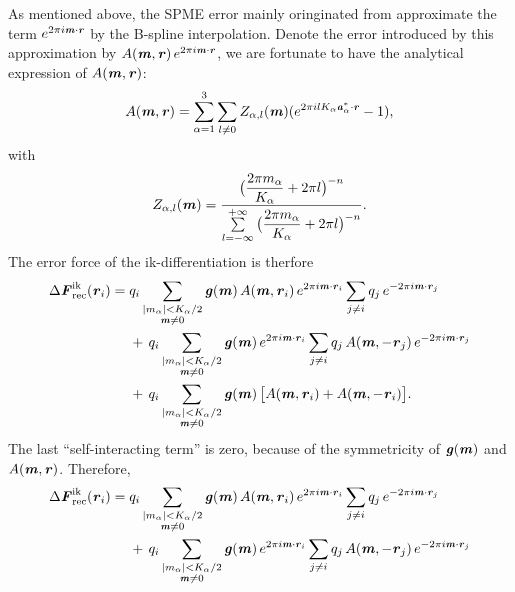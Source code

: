 \documentclass[aps,pre,preprint]{revtex4}
\renewcommand{\v}[1]{\textbf{\textit{#1}}}
\begin{document}
As mentioned above, the SPME error mainly oringinated from approximate
the term $e^{2\pi i\v m\cdot\v r}$ by the B-spline
interpolation. Denote the error introduced by this approximation by
$A(\v m, \v r)\,e^{2\pi i\v m\cdot \v r}$, we are fortunate to have
the analytical expression of $A(\v m, \v r)$:
\begin{align}\label{eqn:error-A}
  A(\v m, \v r)
  =
  \sum_{\alpha=1}^3\sum_{l\neq 0}
  Z_{\alpha,l}(\v m)
  (
  e^{2\pi i l K_\alpha\v a^\ast_\alpha\cdot \v r} - 1
  ),
\end{align}
with
\begin{align}
  Z_{\alpha,l}(\v m) = \frac
  {\big(\dfrac{2\pi m_\alpha}{K_\alpha} + 2\pi l\big)^{-n}}
  {\sum\limits_{l=-\infty}^{+\infty}
    \big(\dfrac{2\pi m_\alpha}{K_\alpha} + 2\pi l\big)^{-n}}.
\end{align}
The error force of the ik-differentiation is therfore
\begin{align}\nonumber
  \Delta\v F_{\textrm{rec}}^{\textrm{ik}}(\v r_i)
  =\;&
  q_i
  \sum_{
    \begin{subarray}{c}
      \vert m_{\alpha}\vert < K_\alpha/2\\
      \v m\neq 0
    \end{subarray}}
  \v g(\v m)\,
  A(\v m, \v r_i)\,
  e^{2\pi i\v m\cdot \v r_i}
  \sum_{j\neq i}q_j\,e^{-2\pi i\v m\cdot\v r_j} \\\nonumber
  & +\,
  q_i
  \sum_{
    \begin{subarray}{c}
      \vert m_{\alpha}\vert < K_\alpha/2\\
      \v m\neq 0
    \end{subarray}}
  \v g(\v m)\,
  e^{2\pi i\v m\cdot \v r_i}
  \sum_{j\neq i}q_j\,A(\v m, -\v r_j)\,e^{-2\pi i\v m\cdot\v r_j}\\\label{eqn:tmp19}
  & +\,
  q_i
  \sum_{
    \begin{subarray}{c}
      \vert m_{\alpha}\vert < K_\alpha/2\\
      \v m\neq 0
    \end{subarray}}
  \v g(\v m)\,
  \big[
  A(\v m, \v r_i) +
  A(\v m, -\v r_i)
  \big].
\end{align}
The last ``self-interacting term'' is zero, because of the
symmetricity of $\v g(\v m)$ and $A(\v m, \v r)$.
Therefore,
\begin{align}\nonumber
  \Delta\v F_{\textrm{rec}}^{\textrm{ik}}(\v r_i)
  =\;&
  q_i
  \sum_{
    \begin{subarray}{c}
      \vert m_{\alpha}\vert < K_\alpha/2\\
      \v m\neq 0
    \end{subarray}}
  \v g(\v m)\,
  A(\v m, \v r_i)\,
  e^{2\pi i\v m\cdot \v r_i}
  \sum_{j\neq i}q_j\,e^{-2\pi i\v m\cdot\v r_j} \\\label{eqn:ik.error.force}
  & +\,
  q_i
  \sum_{
    \begin{subarray}{c}
      \vert m_{\alpha}\vert < K_\alpha/2\\
      \v m\neq 0
    \end{subarray}}
  \v g(\v m)\,
  e^{2\pi i\v m\cdot \v r_i}
  \sum_{j\neq i}q_j\,A(\v m, -\v r_j)\,e^{-2\pi i\v m\cdot\v r_j}
\end{align}
\end{document}
